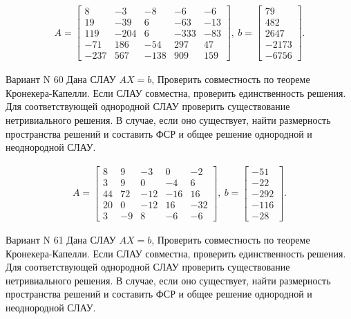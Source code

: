 \documentclass[11pt]{report}
\begin{document}
\begin{align*}
 A = \left[\begin{matrix}8 & -3 & -8 & -6 & -6\\19 & -39 & 6 & -63 & -13\\119 & -204 & 6 & -333 & -83\\-71 & 186 & -54 & 297 & 47\\-237 & 567 & -138 & 909 & 159\end{matrix}\right],
\ b = \left[\begin{matrix}79\\482\\2647\\-2173\\-6756\end{matrix}\right]. 
 \end{align*}

Вариант N 60
Дана СЛАУ $AX = b$,
Проверить совместность по теореме Кронекера-Капелли. Если СЛАУ совместна, проверить единственность решения.
Для соответствующей однородной СЛАУ проверить существование нетривиального решения. В случае, если оно существует,
найти размерность пространства решений и составить ФСР и общее решение однородной  и неоднородной СЛАУ.


\begin{align*}
 A = \left[\begin{matrix}8 & 9 & -3 & 0 & -2\\3 & 9 & 0 & -4 & 6\\44 & 72 & -12 & -16 & 16\\20 & 0 & -12 & 16 & -32\\3 & -9 & 8 & -6 & -6\end{matrix}\right],
\ b = \left[\begin{matrix}-51\\-22\\-292\\-116\\-28\end{matrix}\right]. 
 \end{align*}

Вариант N 61
Дана СЛАУ $AX = b$,
Проверить совместность по теореме Кронекера-Капелли. Если СЛАУ совместна, проверить единственность решения.
Для соответствующей однородной СЛАУ проверить существование нетривиального решения. В случае, если оно существует,
найти размерность пространства решений и составить ФСР и общее решение однородной  и неоднородной СЛАУ.
\end{document}
